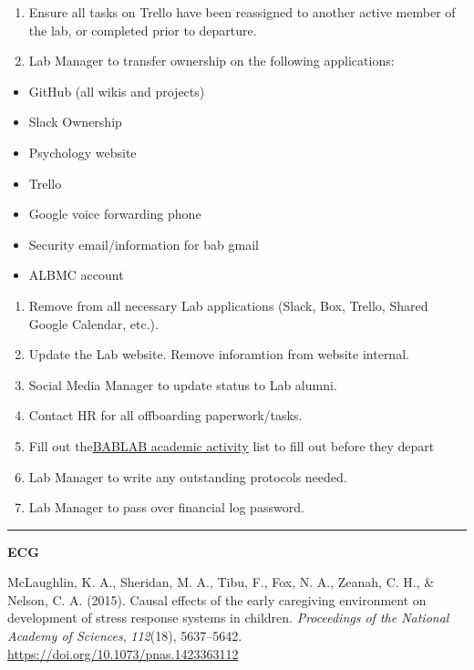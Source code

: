 \documentclass[
]{book}
\providecommand{\tightlist}{%
  \setlength{\itemsep}{0pt}\setlength{\parskip}{0pt}}
\begin{document}
\begin{enumerate}
\def\labelenumi{\arabic{enumi}.}
\tightlist
\item
  Ensure all tasks on Trello have been reassigned to another active member of the lab, or completed prior to departure.
\item
  Lab Manager to transfer ownership on the following applications:
\end{enumerate}

\begin{itemize}
\tightlist
\item
  GitHub (all wikis and projects)
\item
  Slack Ownership
\item
  Psychology website
\item
  Trello
\item
  Google voice forwarding phone
\item
  Security email/information for bab gmail
\item
  ALBMC account
\end{itemize}

\begin{enumerate}
\def\labelenumi{\arabic{enumi}.}
\setcounter{enumi}{2}
\tightlist
\item
  Remove from all necessary Lab applications (Slack, Box, Trello, Shared Google Calendar, etc.).
\item
  Update the Lab website. Remove inforamtion from website internal.
\item
  Social Media Manager to update status to Lab alumni.
\item
  Contact HR for all offboarding paperwork/tasks.
\item
  Fill out the\href{https://docs.google.com/spreadsheets/d/1BDrPZkQR2k0A2yIzCgjrRj-ve8a-tWYQdN2QSSsppbQ/edit?usp=sharing}{BABLAB academic activity} list to fill out before they depart
\item
  Lab Manager to write any outstanding protocols needed.
\item
  Lab Manager to pass over financial log password.
\end{enumerate}

\begin{center}\rule{0.5\linewidth}{0.5pt}\end{center}

\textbf{ECG}

McLaughlin, K. A., Sheridan, M. A., Tibu, F., Fox, N. A., Zeanah, C. H., \& Nelson, C. A. (2015). Causal effects of the early caregiving environment on development of stress response systems in children. \emph{Proceedings of the National Academy of Sciences}, \emph{112}(18), 5637--5642.\\
\url{https://doi.org/10.1073/pnas.1423363112}
\end{document}

